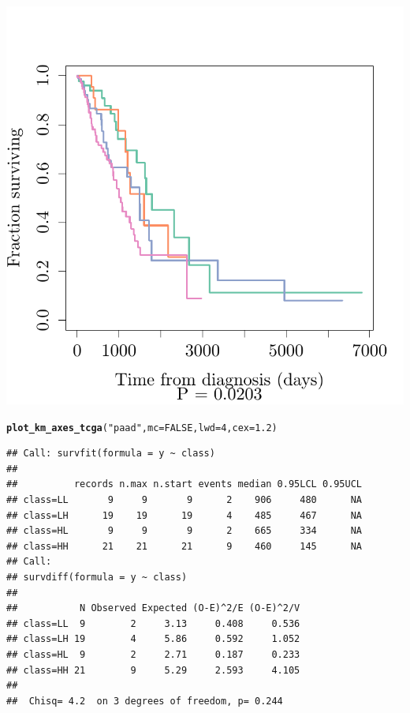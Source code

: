 \documentclass{article}\usepackage[]{graphicx}\usepackage[]{color}
\makeatletter
\def\maxwidth{ %
  \ifdim\Gin@nat@width>\linewidth
    \linewidth
  \else
    \Gin@nat@width
  \fi
}
\newcommand{\hlnum}[1]{\textcolor[rgb]{0.686,0.059,0.569}{#1}}%
\newcommand{\hlstr}[1]{\textcolor[rgb]{0.192,0.494,0.8}{#1}}%
\newcommand{\hlstd}[1]{\textcolor[rgb]{0.345,0.345,0.345}{#1}}%
\newcommand{\hlkwc}[1]{\textcolor[rgb]{0.333,0.667,0.333}{#1}}%
\newcommand{\hlkwd}[1]{\textcolor[rgb]{0.737,0.353,0.396}{\textbf{#1}}}%
\newenvironment{kframe}{%
 \def\at@end@of@kframe{}%
 \ifinner\ifhmode%
  \def\at@end@of@kframe{\end{minipage}}%
  \begin{minipage}{\columnwidth}%
 \fi\fi%
 \def\FrameCommand##1{\hskip\@totalleftmargin \hskip-\fboxsep
 \colorbox{shadecolor}{##1}\hskip-\fboxsep
     \hskip-\linewidth \hskip-\@totalleftmargin \hskip\columnwidth}%
 \MakeFramed {\advance\hsize-\width
   \@totalleftmargin\z@ \linewidth\hsize
   \@setminipage}}%
 {\par\unskip\endMakeFramed%
 \at@end@of@kframe}
\newenvironment{knitrout}{}{} %
\makeatother
\begin{document}
\begin{knitrout}
{}




{\centering \includegraphics[width=\maxwidth]{figure/km-curves-14} 

}


\begin{kframe}\begin{alltt}
\hlkwd{plot_km_axes_tcga}\hlstd{(}\hlstr{"paad"}\hlstd{,} \hlkwc{mc} \hlstd{=} \hlnum{FALSE}\hlstd{,} \hlkwc{lwd} \hlstd{=} \hlnum{4}\hlstd{,} \hlkwc{cex} \hlstd{=} \hlnum{1.2}\hlstd{)}
\end{alltt}
\begin{verbatim}
## Call: survfit(formula = y ~ class)
## 
##          records n.max n.start events median 0.95LCL 0.95UCL
## class=LL       9     9       9      2    906     480      NA
## class=LH      19    19      19      4    485     467      NA
## class=HL       9     9       9      2    665     334      NA
## class=HH      21    21      21      9    460     145      NA
## Call:
## survdiff(formula = y ~ class)
## 
##           N Observed Expected (O-E)^2/E (O-E)^2/V
## class=LL  9        2     3.13     0.408     0.536
## class=LH 19        4     5.86     0.592     1.052
## class=HL  9        2     2.71     0.187     0.233
## class=HH 21        9     5.29     2.593     4.105
## 
##  Chisq= 4.2  on 3 degrees of freedom, p= 0.244
\end{verbatim}
\end{kframe}


\end{knitrout}
\end{document}
